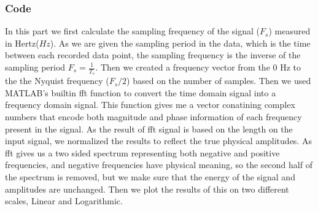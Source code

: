 \documentclass[12pt, a4paper]{article}
\begin{document}
\subsubsection{Code}
In this part we first calculate the  sampling frequency of the signal ($F_s$) measured in Hertz($Hz$). As we are given the sampling period in the data, which is the time between each recorded data point, the sampling frequency is the inverse of the sampling period $F_s = \frac{1}{T_s}$. Then we created a frequency vector from the 0 Hz to the the Nyquist frequency ($F_s/2$) based on the number of samples. Then we used MATLAB's builtin fft function to convert the time domain signal into a frequency domain signal. This function gives me a vector conatining complex numbers that encode both magnitude and phase information of each frequency present in the signal. As the result of fft signal is based on the length on the input signal, we normalized the results to reflect the true physical amplitudes. As fft gives us a two sided spectrum representing both negative and positive frequencies, and negative frequencies have physical meaning, so the second half of the spectrum is removed, but we make sure that the energy of the signal and amplitudes are unchanged. Then we plot the results of this on two different scales, Linear and Logarithmic.
\end{document}
